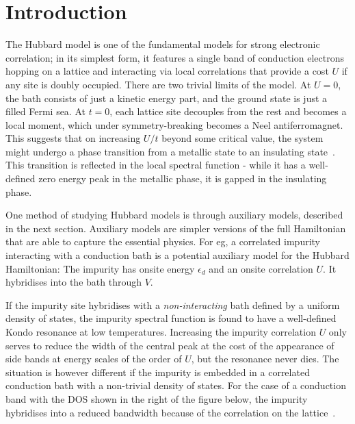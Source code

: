 \documentclass[reprint,superscriptaddress,floatfix]{revtex4-2}
\begin{document}
\section{Introduction}

The Hubbard model is one of the fundamental models for strong electronic correlation; in its simplest form, it features a single band of conduction electrons hopping on a lattice and interacting via local correlations that provide a cost \(U\) if any site is doubly occupied. There are two trivial limits of the model. At \(U=0\), the bath consists of just a kinetic energy part, and the ground state is just a filled Fermi sea. At \(t=0\), each lattice site decouples from the rest and becomes a local moment, which under symmetry-breaking becomes a Neel antiferromagnet. This suggests that on increasing \(U/t\) beyond some critical value, the system might undergo a phase transition from a metallic state to an insulating state~\cite{Mott_1949}. This transition is reflected in the local spectral function - while it has a well-defined zero energy peak in the metallic phase, it is gapped in the insulating phase.

One method of studying Hubbard models is through auxiliary models, described in the next section. Auxiliary models are simpler versions of the full Hamiltonian that are able to capture the essential physics. For eg, a correlated impurity interacting with a conduction bath is a potential auxiliary model for the Hubbard Hamiltonian:
The impurity has onsite energy \(\epsilon_d\) and an onsite correlation \(U\). It hybridises into the bath through \(V\).

If the impurity site hybridises with a {\it non-interacting} bath defined by a uniform density of states, the impurity spectral function is found to have a well-defined Kondo resonance at low temperatures. Increasing the impurity correlation \(U\) only serves to reduce the width of the central peak at the cost of the appearance of side bands at energy scales of the order of \(U\), but the resonance never dies. The situation is however different if the impurity is embedded in a correlated conduction bath with a non-trivial density of states. For the case of a conduction band with the DOS shown in the right of the figure below, the impurity hybridises into a reduced bandwidth because of the correlation on the lattice~\cite{held_2013}.
\end{document}
